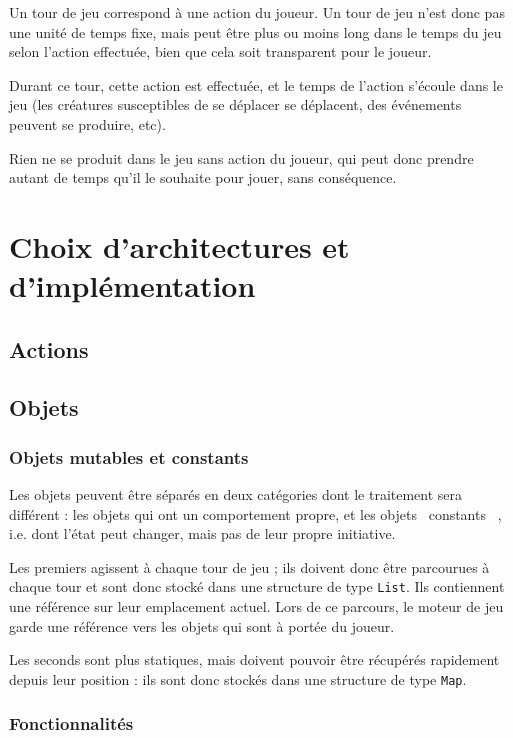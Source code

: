 \documentclass[french]{article}
\makeatletter
\providecommand{\og}{\leavevmode\flqq~}%
\providecommand{\fg}{\ifdim\lastskip>\z@\unskip\fi~\frqq}%
\makeatother
\begin{document}
Un tour de jeu correspond à une action du joueur. Un tour de jeu n'est
donc pas une unité de temps fixe, mais peut être plus ou moins long
dans le temps du jeu selon l'action effectuée, bien que cela soit
transparent pour le joueur.

Durant ce tour, cette action est effectuée, et le temps de l'action
s'écoule dans le jeu (les créatures susceptibles de se déplacer se
déplacent, des événements peuvent se produire, etc).

Rien ne se produit dans le jeu sans action du joueur, qui peut donc
prendre autant de temps qu'il le souhaite pour jouer, sans conséquence.


\section{Choix d'architectures et d'implémentation}


\subsection{Actions}


\subsection{Objets}


\subsubsection{Objets mutables et constants}

Les objets peuvent être séparés en deux catégories dont le traitement
sera différent : les objets qui ont un comportement propre, et les
objets \og constants \fg{}, i.e. dont l'état peut changer, mais
pas de leur propre initiative.

Les premiers agissent à chaque tour de jeu ; ils doivent donc être
parcourues à chaque tour et sont donc stocké dans une structure de
type \texttt{List}. Ils contiennent une référence sur leur emplacement
actuel. Lors de ce parcours, le moteur de jeu garde une référence
vers les objets qui sont à portée du joueur.

Les seconds sont plus statiques, mais doivent pouvoir être récupérés
rapidement depuis leur position : ils sont donc stockés dans une structure
de type \texttt{Map}.


\subsubsection{Fonctionnalités}
\end{document}
